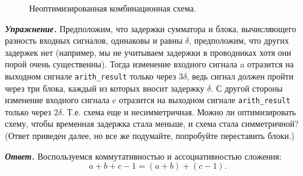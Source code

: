 \begin{figure}[ht]
\centering
{}
\caption{Неоптимизированная комбинационная схема.}
\label{comb_circuit_noopt}
\end{figure}

\textbf{\textit{Упражнение.}} Предположим, что задержки сумматора и блока, вычисляющего разность входных сигналов, одинаковы и равны $\delta$, предположим, что других задержек нет (например, мы не учитываем задержки в проводниках хотя они порой очень существенны). Тогда изменение входного сигнала a отразится на выходном сигнале \lstinline?arith_result? только через $3 \delta$, ведь сигнал должен пройти через три блока, каждый из которых вносит задержку $\delta$. С другой стороны изменение входного сигнала c отразится на выходном сигнале \lstinline?arith_result? только через $2 \delta$. Т.е. схема еще и несимметричная. Можно ли оптимизировать схему, чтобы временная задержка стала меньше, и схема стала симметричной? (Ответ приведен далее, но все же подумайте, попробуйте переставить блоки.)

\textbf{\textit{Ответ.}} Воспользуемся коммутативностью и ассоциативностью сложения: 
\[
a + b + c - 1 = (a + b) + (c - 1).
\]

